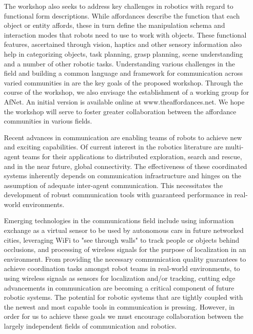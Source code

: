 \begin{spacing}{1.0}
{The workshop also seeks to address key challenges in robotics with regard to functional form descriptions. While affordances describe the function that each object or entity affords, these in turn define the manipulation schema and interaction modes that robots need to use to work with objects. These functional features, ascertained through vision, haptics and other sensory information also help in categorizing objects, task planning, grasp planning, scene understanding and a number of other robotic tasks. Understanding various challenges in the field and building a common language and framework for communication across varied communities in are the key goals of the proposed workshop. Through the course of the workshop, we also envisage the establishment of a working group for AfNet. An initial version is available online at www.theaffordances.net. We hope the workshop will serve to foster greater collaboration between the affordance communities in various fields.
}


{
Recent advances in communication are enabling teams of robots to achieve new and exciting capabilities. Of current interest in the robotics literature are multi-agent teams for their applications to distributed exploration, search and rescue, and in the near future, global connectivity. The effectiveness of these coordinated systems inherently depends on communication infrastructure and hinges on the assumption of adequate inter-agent communication. This necessitates the development of robust communication tools with guaranteed performance in real-world environments.

Emerging technologies in the communications field include using information exchange as a virtual sensor to be used by autonomous cars in future networked cities, leveraging WiFi to "see through walls" to track people or objects behind occlusions, and processing of wireless signals for the purpose of localization in an environment. From providing the necessary communication quality guarantees to achieve coordination tasks amongst robot teams in real-world environments, to using wireless signals as sensors for localization and/or tracking, cutting edge advancements in communication are becoming a critical component of future robotic systems. The potential for robotic systems that are tightly coupled with the newest and most capable tools in communication is pressing. However, in order for us to achieve these goals we must encourage collaboration between the largely independent fields of communication and robotics.

}
\end{spacing}
